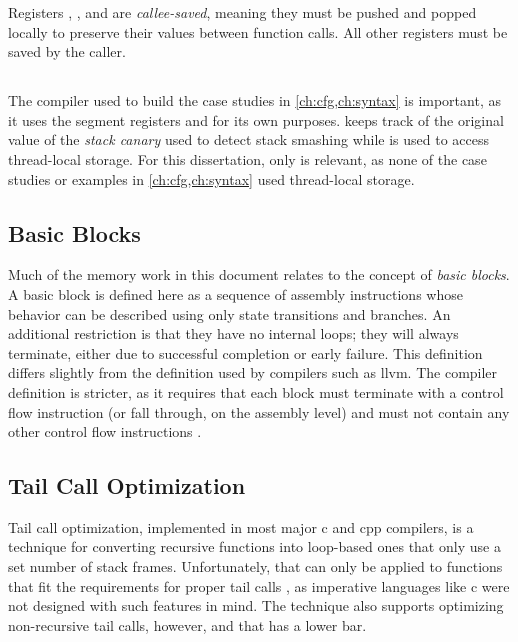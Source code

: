 Registers \rbx, \rbp, and  are
\emph{callee-saved}, meaning they must be pushed and popped locally to preserve their
values between function calls. All other registers must be saved by the caller.

\subsection{}
The compiler used to build the case studies in \cref{ch:cfg,ch:syntax} is important,
as it uses the segment registers  and  for its own purposes.
 keeps track of the original value of the \emph{stack canary}
used to detect stack smashing \autocite{cowan1998stackguard}
while  is used to access thread-local storage.
For this dissertation, only  is relevant, as none of the case studies
or examples in \cref{ch:cfg,ch:syntax} used thread-local storage.

\subsection{Basic Blocks}
Much of the memory work in this document relates to the concept of \emph{basic blocks}.%
A basic block is defined here as a sequence of assembly instructions
whose behavior can be described using only state transitions and branches.
An additional restriction is that they have no internal loops;
they will always terminate, either due to successful completion or early failure.
This definition differs slightly from the definition used by compilers such as \gls{llvm}.
The compiler definition is stricter, as it requires that
each block must terminate with a control flow instruction
(or fall through, on the assembly level)
and must not contain any other control flow instructions
\autocite{llvm:functions,llvm:terminators}.

\subsection{Tail Call Optimization}
Tail call%
optimization, implemented in most major \gls{c} and \gls{cpp} compilers, is a technique
for converting recursive functions into loop-based ones that only use
a set number of stack frames.
Unfortunately, that can only be applied to functions that fit the requirements
for proper tail calls \autocite{probst2001proper},
as imperative languages like \gls{c} were not designed with such features in mind.
The technique also supports optimizing non-recursive tail calls, however,
and that has a lower bar.

